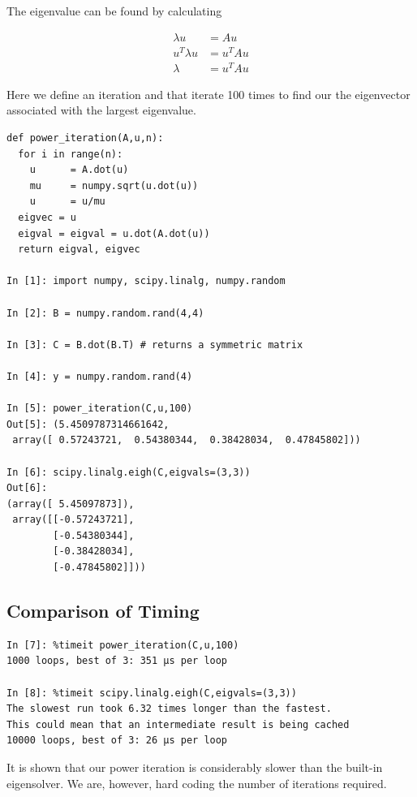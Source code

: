 \documentclass[12pt,]{book}
\begin{document}
The eigenvalue can be found by calculating

\begin{align*}
\lambda u &= A u\\
u^T\lambda u &= u^TA u\\
\lambda &= u^TAu \tag{because $u$ is normalized}
\end{align*}

\vfill

\pagebreak

Here we define an iteration and that iterate 100 times to find our the
eigenvector associated with the largest eigenvalue.

\begin{verbatim}
def power_iteration(A,u,n):
  for i in range(n):
    u      = A.dot(u)
    mu     = numpy.sqrt(u.dot(u))
    u      = u/mu
  eigvec = u
  eigval = eigval = u.dot(A.dot(u))
  return eigval, eigvec

In [1]: import numpy, scipy.linalg, numpy.random

In [2]: B = numpy.random.rand(4,4)

In [3]: C = B.dot(B.T) # returns a symmetric matrix

In [4]: y = numpy.random.rand(4)

In [5]: power_iteration(C,u,100)
Out[5]: (5.4509787314661642,
 array([ 0.57243721,  0.54380344,  0.38428034,  0.47845802]))

In [6]: scipy.linalg.eigh(C,eigvals=(3,3))
Out[6]:
(array([ 5.45097873]), 
 array([[-0.57243721],
        [-0.54380344],
        [-0.38428034],
        [-0.47845802]]))
\end{verbatim}

\subsection{Comparison of Timing}\label{comparison-of-timing-1}

\begin{verbatim}
In [7]: %timeit power_iteration(C,u,100)
1000 loops, best of 3: 351 µs per loop

In [8]: %timeit scipy.linalg.eigh(C,eigvals=(3,3))
The slowest run took 6.32 times longer than the fastest. 
This could mean that an intermediate result is being cached
10000 loops, best of 3: 26 µs per loop
\end{verbatim}

It is shown that our power iteration is considerably slower than the
built-in eigensolver. We are, however, hard coding the number of
iterations required.
\end{document}
